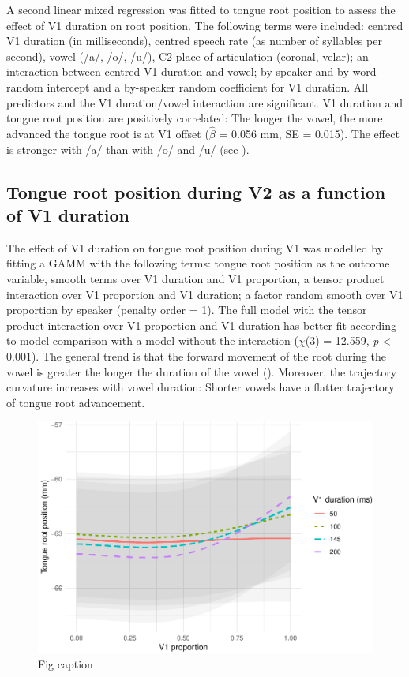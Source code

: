 \documentclass[12pt,]{article}
\begin{document}
A second linear mixed regression was fitted to tongue root position to
assess the effect of V1 duration on root position. The following terms
were included: centred V1 duration (in milliseconds), centred speech
rate (as number of syllables per second), vowel (/a/, /o/, /u/), C2
place of articulation (coronal, velar); an interaction between centred
V1 duration and vowel; by-speaker and by-word random intercept and a
by-speaker random coefficient for V1 duration. All predictors and the V1
duration/vowel interaction are significant. V1 duration and tongue root
position are positively correlated: The longer the vowel, the more
advanced the tongue root is at V1 offset (\(\hat{\beta}\) = 0.056 mm, SE
= 0.015). The effect is stronger with /a/ than with /o/ and /u/ (see
).

\hypertarget{tongue-root-position-during-v2-as-a-function-of-v1-duration}{%
\subsection{Tongue root position during V2 as a function of V1
duration}\label{tongue-root-position-during-v2-as-a-function-of-v1-duration}}

The effect of V1 duration on tongue root position during V1 was modelled
by fitting a GAMM with the following terms: tongue root position as the
outcome variable, smooth terms over V1 duration and V1 proportion, a
tensor product interaction over V1 proportion and V1 duration; a factor
random smooth over V1 proportion by speaker (penalty order = 1). The
full model with the tensor product interaction over V1 proportion and V1
duration has better fit according to model comparison with a model
without the interaction (\(\chi\)(3) = 12.559, \emph{p} \textless{}
0.001). The general trend is that the forward movement of the root
during the vowel is greater the longer the duration of the vowel
(). Moreover, the trajectory curvature increases
with vowel duration: Shorter vowels have a flatter trajectory of tongue
root advancement.

\begin{figure}
\includegraphics[width=\linewidth]{2018-tra_files/figure-latex/tra-gam-2-plot-1} \caption{Fig caption}\label{f:tra-gam-2-plot}
\end{figure}
\end{document}
